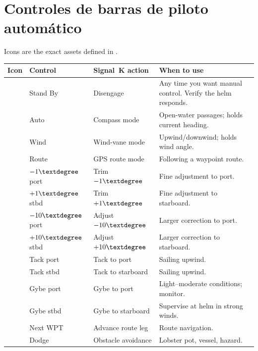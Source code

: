 
\section{Controles de barras de piloto automático}

Icons are the exact assets defined in .

\begin{longtable}{C{1.4cm}L{2.4cm}L{4.6cm}L{5.3cm}}
\toprule
{}
\color{white}\sffamily\bfseries Icon &
\color{white}\sffamily\bfseries Control &
\color{white}\sffamily\bfseries Signal~K action &
\color{white}\sffamily\bfseries When to use \\
\midrule
{}                & Stand By    & Disengage         & Any time you want manual control. Verify the helm responds. \\
           & Auto        & Compass mode      & Open-water passages; holds current heading. \\
                      & Wind        & Wind-vane mode    & Upwind/downwind; holds wind angle. \\
            & Route       & GPS route mode    & Following a waypoint route. \\
               & $-1\textdegree$ port  & Trim $-1\textdegree$ & Fine adjustment to port. \\
                & $+1\textdegree$ stbd  & Trim $+1\textdegree$ & Fine adjustment to starboard. \\
  & $-10\textdegree$ port & Adjust $-10\textdegree$ & Larger correction to port. \\
 & $+10\textdegree$ stbd & Adjust $+10\textdegree$ & Larger correction to starboard. \\
           & Tack port   & Tack to port      & Sailing upwind. \\
          & Tack stbd   & Tack to starboard & Sailing upwind. \\
  & Gybe port   & Gybe to port      & Light--moderate conditions; monitor. \\
 & Gybe stbd   & Gybe to starboard & Supervise at helm in strong winds. \\
       & Next WPT    & Advance route leg & Route navigation. \\
                      & Dodge       & Obstacle avoidance & Lobster pot, vessel, hazard. \\
\bottomrule
\end{longtable}


